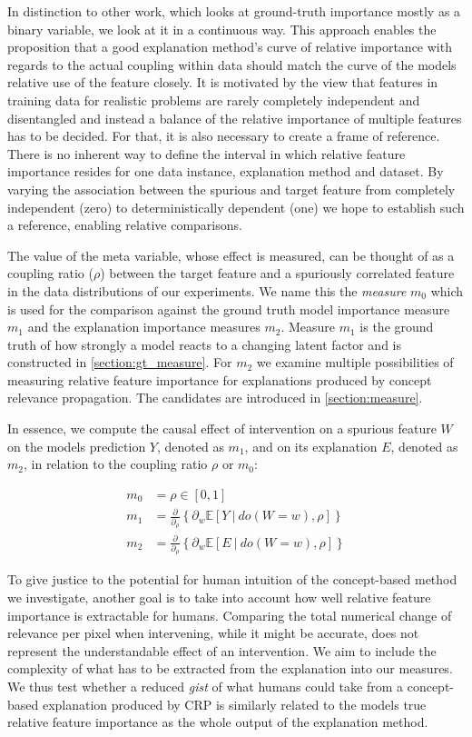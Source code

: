 In distinction to other work, which looks at ground-truth importance mostly as a binary variable, we look at it in a continuous way. This approach enables the proposition that a good explanation method's curve of relative importance with regards to the actual coupling within data should match the curve of the models relative use of the feature closely. It is motivated by the view that features in training data for realistic problems are rarely completely independent and disentangled and instead a balance of the relative importance of multiple features has to be decided. For that, it is also necessary to create a frame of reference. There is no inherent way to define the interval in which relative feature importance resides for one data instance, explanation method and dataset. By varying the association between the spurious and target feature from completely independent (zero) to deterministically dependent (one) we hope to establish such a reference, enabling relative comparisons. 

The value of the meta variable, whose effect is measured, can be thought of as a coupling ratio ($\rho$) between the target feature and a spuriously correlated feature in the data distributions of our experiments. We name this the \textit{measure} $m_0$ which is used for the comparison against the ground truth model importance measure $m_1$ and the explanation importance measures $m_2$. Measure $m_1$ is the ground truth of how strongly a model reacts to a changing latent factor and is constructed in \cref{section:gt_measure}. For $m_2$ we examine multiple possibilities of measuring relative feature importance for explanations produced by concept relevance propagation. The candidates are introduced in \autoref{section:measure}. 

In essence, we compute the causal effect of intervention on a spurious feature $W$ on the models prediction $Y$, denoted as $m_1$, and on its explanation $E$, denoted as $m_2$, in relation to the coupling ratio $\rho$ or $m_0$:

\begin{align}\displaystyle
m_{0} & = \rho \in [0,1] \\
 m_{1} & = \tfrac{\partial}{\partial_{\rho}} \left\{ {\partial_w}\mathbb{E} [ Y \ | \ do(W=w), \rho ] \right\}  \\
 m_{2} & = \tfrac{\partial}{\partial_{\rho}} \left\{{\partial_w}\mathbb{E} [ E \ | \ do(W=w), \rho ] \right\}
\end{align}

To give justice to the potential for human intuition of the concept-based method we investigate, another goal is to take into account how well relative feature importance is extractable for humans. Comparing the total numerical change of relevance per pixel when intervening, while it might be accurate, does not represent the understandable effect of an intervention. We aim to include the complexity of what has to be extracted from the explanation into our measures. We thus test whether a reduced \textit{gist} of what humans could take from a concept-based explanation produced by CRP is similarly related to the models true relative feature importance as the whole output of the explanation method. 

